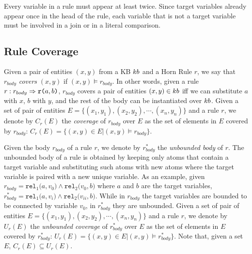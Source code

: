  Every variable in a rule must appear at least twice. Since target variables already appear once in the head of the rule, 
each variable that is not a target variable must be involved in a join or in a literal comparison.  


\vspace{-1ex}
\subsection{Rule Coverage}
\vspace{-0.2ex}
Given a pair of entities $(x,y)$ from a KB ${\sc kb}$ and a Horn Rule $r$, we say that $r_{body}$ \emph{covers} $(x,y)$ if
$(x,y) \models r_{body}$. In other words, given a rule $r : r_{body} \Rightarrow \texttt{r(}a,b\texttt{)}$, $r_{body}$ covers a pair of entities $(x,y) \in {\sc kb}$ iff we can substitute $a$ with $x$, $b$ with $y$, and the rest of the body can be instantiated over ${\sc kb}$. Given a set of pair of entities $E = \{(x_1,y_1),(x_2,y_2),\cdots,(x_n,y_n)\}$ and a rule $r$, we denote by $C_r(E)$ the \emph{coverage} of $r_{body}$ over $E$ as the set of elements in $E$ covered by $r_{body}$: $C_r(E)=\{(x,y) \in E | (x,y) \models r_{body}\}$.

Given the body $r_{body}$ of a rule $r$, we denote by $r^{*}_{body}$ the \emph{unbounded body} of $r$. The unbounded body of a rule is obtained by keeping only atoms that contain a target variable and substituting such atoms with new atoms where the target variable is paired with a new unique variable. As an example, given $r_{body} = \texttt{rel}_1\texttt{(}a,v_0\texttt{)} \wedge \texttt{rel}_2\texttt{(}v_0,b\texttt{)}$ where $a$ and $b$ are the target variables, $r^{*}_{body} = \texttt{rel}_1\texttt{(}a,v_i\texttt{)} \wedge \texttt{rel}_2\texttt{(}v_{ii},b\texttt{)}$.
While in $r_{body}$ the target variables are bounded to be connected by variable $v_0$, in $r^{*}_{body}$ %
they are unbounded.
Given a set of pair of entities $E = \{(x_1,y_1),(x_2,y_2),\cdots,(x_n,y_n)\}$ and a rule $r$, we denote by $U_r(E)$ the \emph{unbounded coverage} of $r^{*}_{body}$ over $E$ as the set of elements in $E$ covered by $r^{*}_{body}$: $U_r(E)=\{(x,y) \in E | (x,y) \models r^{*}_{body}\}$. Note that, given a set $E$, $C_r(E) \subseteq U_r(E)$. 

